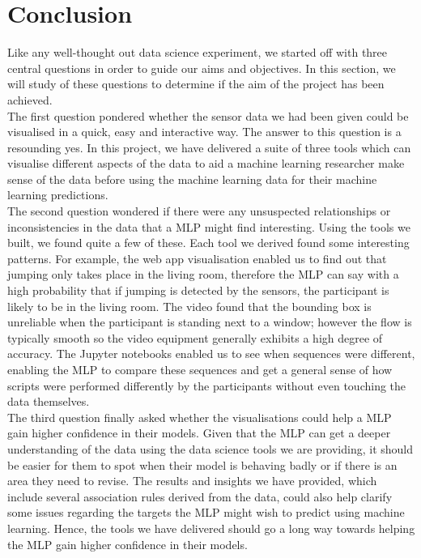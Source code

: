 \documentclass[fleqn,10pt]{SelfArx} %
\begin{document}
\section{Conclusion}
Like any well-thought out data science experiment, we started off with three central questions in order to guide our aims and objectives. In this section, we will study of these questions to determine if the aim of the project has been achieved. \\

The first question pondered whether the sensor data we had been given could be visualised in a quick, easy and interactive way. The answer to this question is a resounding yes. In this project, we have delivered a suite of three tools which can visualise different aspects of the data to aid a machine learning researcher make sense of the data before using the machine learning data for their machine learning predictions.\\

The second question wondered if there were any unsuspected relationships or inconsistencies in the data that a MLP might find interesting. Using the tools we built, we found quite a few of these. Each tool we derived found some interesting patterns. For example, the web app visualisation enabled us to find out that jumping only takes place in the living room, therefore the MLP can say with a high probability that if jumping is detected by the sensors, the participant is likely to be in the living room. The video found that the bounding box is unreliable when the participant is standing next to a window; however the flow is typically smooth so the video equipment generally exhibits a high degree of accuracy. The Jupyter notebooks enabled us to see when sequences were different, enabling the MLP to compare these sequences and get a general sense of how scripts were performed differently by the participants without even touching the data themselves.\\

The third question finally asked whether the visualisations could help a MLP gain higher confidence in their models. Given that the MLP can get a deeper understanding of the data using the data science tools we are providing, it should be easier for them to spot when their model is behaving badly or if there is an area they need to revise. The results and insights we have provided, which include several association rules derived from the data, could also help clarify some issues regarding the targets the MLP might wish to predict using machine learning. Hence, the tools we have delivered should go a long way towards helping the MLP gain higher confidence in their models.\\
\end{document}
